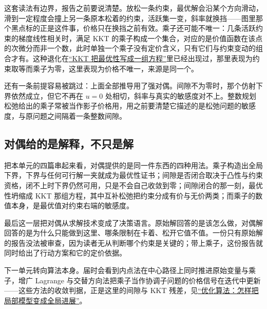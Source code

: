 这套读法有边界，报告之前要说清楚。放松一条约束，最优解会沿某个方向滑动，滑到一定程度会撞上另一条原本松着的约束，活跃集一变，斜率就换挡——图里那个黑点标的正是这件事，价格只在换挡之前有效。乘子还可能不唯一：几条活跃约束的梯度线性相关时，满足 KKT 的乘子构成一个集合，对应的是价值函数在该点的次微分而非一个数，此时单独一个乘子没有定价含义，只有它们与约束变动的组合才有。这种退化在\hyperref[sec:09-Convex-Optimization/05-Duality/03]{``KKT 把最优性写成一组方程''}里已经出现过，那里表现为约束取等而乘子为零，这里表现为价格不唯一，来源是同一个。

还有一条前提容易被跳过：上面全部推导用了强对偶。间隙不为零时，那个仿射下界依然成立，但它不再在 \(u=0\) 处相切，斜率与真实的敏感度对不上。整数规划松弛给出的乘子常被当作影子价格用，用之前要清楚它描述的是松弛问题的敏感度，与原问题之间隔着一条整数间隙。

\subsection{对偶给的是解释，不只是解}

把本单元的四篇串起来看，对偶提供的是同一件东西的四种用法。乘子构造出全局下界，下界与任何可行解一夹就成为最优性证书；间隙是否闭合取决于凸性与约束资格，闭不上时下界仍然可用，只是不会自己收敛到零；间隙闭合的那一刻，最优性坍缩成 KKT 那组方程，其中互补松弛把约束分成有价与无价两类；而乘子的数值本身，是最优值对约束右端的敏感度。

最后这一层把对偶从求解技术变成了决策语言。原始解回答的是该怎么做，对偶解回答的是为什么只能做到这里、哪条限制在卡着、松开它值不值。一份只有原始解的报告没法被审查，因为读者无从判断哪个约束是关键的；带上乘子，这份报告就同时给出了行动方案和它的定价依据。

下一单元转向算法本身。届时会看到内点法在中心路径上同时推进原始变量与乘子，增广 Lagrange 与交替方向法把乘子当作协调子问题的价格信号在迭代中更新——这些方法的收敛判据，正是这里的间隙与 KKT 残差，见\hyperref[ch:076]{``优化算法：怎样把局部模型变成全局进展''}。
